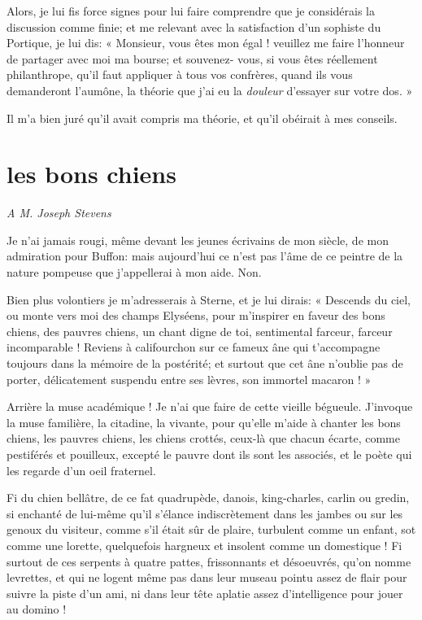 Alors, je lui fis force signes pour lui faire comprendre que je
considérais la discussion comme finie; et me relevant avec la
satisfaction d’un sophiste du Portique, je lui dis: «
Monsieur, vous êtes mon égal ! veuillez me faire
l’honneur de partager avec moi ma bourse; et
souvenez{}- vous, si vous êtes réellement philanthrope,
qu’il faut appliquer à tous vos confrères, quand ils
vous demanderont l’aumône, la théorie que
j’ai eu la \textit{douleur} d’essayer sur
votre dos. »

Il m’a bien juré qu’il avait compris
ma théorie, et qu’il obéirait à mes conseils.

\quebra\section[Les bons chiens]{les bons chiens }

\begin{flushright}
\textit{A M. Joseph Stevens} 
\end{flushright}

Je n’ai jamais rougi, même devant les jeunes écrivains
de mon siècle, de mon admiration pour Buffon: mais
aujourd’hui ce n’est pas
l’âme de ce peintre de la nature pompeuse que
j’appellerai à mon aide. Non.

Bien plus volontiers je m’adresserais à Sterne, et je
lui dirais: « Descends du ciel, ou monte vers moi des champs Elyséens,
pour m’inspirer en faveur des bons chiens, des pauvres
chiens, un chant digne de toi, sentimental farceur, farceur
incomparable ! Reviens à califourchon sur ce fameux âne qui
t’accompagne toujours dans la mémoire de la postérité;
et surtout que cet âne n’oublie pas de porter,
délicatement suspendu entre ses lèvres, son immortel macaron ! »

Arrière la muse académique ! Je n’ai que faire de cette
vieille bégueule. J’invoque la muse familière, la
citadine, la vivante, pour qu’elle
m’aide à chanter les bons chiens, les pauvres chiens,
les chiens crottés, ceux{}-là que chacun écarte, comme pestiférés et
pouilleux, excepté le pauvre dont ils sont les associés, et le poète
qui les regarde d’un oeil fraternel.

Fi du chien bellâtre, de ce fat quadrupède, danois, king{}-charles,
carlin ou gredin, si enchanté de lui{}-même qu’il
s’élance indiscrètement dans les jambes ou sur les
genoux du visiteur, comme s’il était sûr de plaire,
turbulent comme un enfant, sot comme une lorette, quelquefois hargneux
et insolent comme un domestique ! Fi surtout de ces serpents à quatre
pattes, frissonnants et désoeuvrés, qu’on nomme
levrettes, et qui ne logent même pas dans leur museau pointu assez de
flair pour suivre la piste d’un ami, ni dans leur tête
aplatie assez d’intelligence pour jouer au domino !

